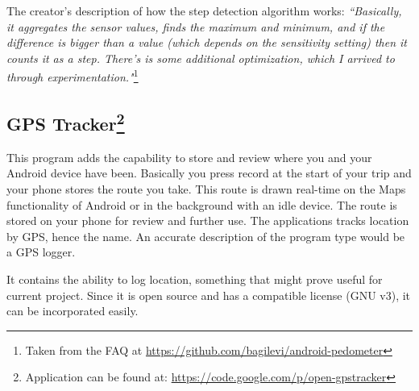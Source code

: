 The creator's description of how the step detection algorithm works: \textit{``Basically, it aggregates the sensor values, finds the maximum and minimum, and if the difference is bigger than a value (which depends on the sensitivity setting) then it counts it as a step. There's is some additional optimization, which I arrived to through experimentation."}\footnote{Taken from the FAQ at \url{https://github.com/bagilevi/android-pedometer}}

\subsection{GPS Tracker\footnote{Application can be found at: \url{https://code.google.com/p/open-gpstracker}}}
This program adds the capability to store and review where you and your Android device have been. Basically you press record at the start of your trip and your phone stores the route you take. This route is drawn real-time on the Maps functionality of Android or in the background with an idle device. The route is stored on your phone for review and further use. The applications tracks location by GPS, hence the name. An accurate description of the program type would be a GPS logger.

It contains the ability to log location, something that might prove useful for current project. Since it is open source and has a compatible license (GNU v3), it can be incorporated easily.